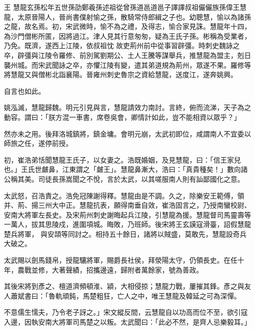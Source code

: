 
\begin{pinyinscope}

 王
 慧龍玄孫松年五世孫劭鄭羲孫述祖從曾孫道邕道邕子譯譯叔祖儼儼族孫偉王慧龍，太原晉陽人，晉尚書僕射愉之孫，散騎常侍郎緝之子也。幼聰慧，愉以為諸孫之龍，故名焉。初，宋武微時，愉不為之禮，及得志，愉合家見誅。慧龍年十四，為沙門僧彬所匿，因將過江。津人見其行意匆匆，疑為王氏子孫。彬稱為受業者，乃免。既濟，遂西上江陵，依叔祖忱
 故吏荊州前中從事習辟彊。時刺史魏詠之卒，辟彊與江陵令羅修、前別駕劉期公、土人王騰等謀舉兵，推慧龍為盟主，剋日襲州城。而宋武聞詠之卒，亦懼江陵有變，遣其弟道規為荊州，眾遂不果。羅修等將慧龍又與僧彬北詣襄陽。晉雍州刺史魯宗之資給慧龍，送度江，遂奔姚興。



 自言也如此。



 姚泓滅，慧龍歸魏。明元引見與言，慧龍請效力南討。言終，俯而流涕，天子為之動容。謂曰：「朕方混一車書，席卷吳會，卿情計如此，豈不能相資以眾乎？」



 然亦未之用。後拜洛城鎮將，鎮金墉。會明元崩，太武初即位，咸謂南人不宜委以師旅之任，遂停前授。



 初，崔浩弟恬聞慧龍王氏子，以女妻之。浩既婚姻，及見慧龍，曰：「信王家兒也。」王氏世皻鼻，江東謂之「皻王」。慧龍鼻漸大，浩曰：「真貴種矣！」數向諸公稱其美。司徒長孫嵩聞之不悅，言於太武，以其嗟服南人則有訕鄙國化之意。



 太武怒，召浩責之。浩免冠陳謝得釋。慧龍由是不調。久之，除樂安王範傅，領并、荊、揚三州大中正。慧龍抗表，願得南垂自效，崔浩固言之，乃授南蠻校尉、安南大將軍左長史。及宋荊州刺史謝晦起兵江陵，引慧龍為援。慧龍督司馬靈壽等一萬人，拔其思陵戍，進圍項城。晦敗，乃班師。後宋將王玄謨寇滑臺，詔假慧龍楚兵將軍，
 與安頡等同討之。相持五十餘日，諸將以賊盛，莫敢先，慧龍設奇兵大破之。



 太武賜以劍馬錢帛，授龍驤將軍，賜爵長社侯，拜滎陽太守，仍領長史。在任十年，農戰並修，大著聲績，招攜邊遠，歸附者萬餘家，號為善政。



 其後宋將到彥之、檀道濟頻頓淮、潁，大相侵掠；慧龍力戰，屢摧其鋒。彥之與友人蕭斌書曰：「魯軌頑鈍，馬楚粗狂，亡人之中，唯王慧龍及韓延之可為深憚。



 不意儒生懦夫，乃令老子訝之。」宋文縱反間，云慧龍自以功高而位不至，欲引寇入邊，因執安南大將軍司馬楚之以叛。太武聞曰：「此必不然，是齊人忌樂毅耳。」




\end{pinyinscope}
